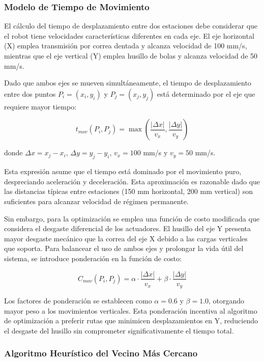 \subsubsection{Modelo de Tiempo de Movimiento}

El cálculo del tiempo de desplazamiento entre dos estaciones debe considerar que el robot tiene velocidades características diferentes en cada eje. El eje horizontal (X) emplea transmisión por correa dentada y alcanza velocidad de 100 mm/s, mientras que el eje vertical (Y) emplea husillo de bolas y alcanza velocidad de 50 mm/s.

Dado que ambos ejes se mueven simultáneamente, el tiempo de desplazamiento entre dos puntos $P_i = (x_i, y_i)$ y $P_j = (x_j, y_j)$ está determinado por el eje que requiere mayor tiempo:

\begin{equation}
t_{mov}(P_i, P_j) = \max\left(\frac{|\Delta x|}{v_x}, \frac{|\Delta y|}{v_y}\right)
\end{equation}

donde $\Delta x = x_j - x_i$, $\Delta y = y_j - y_i$, $v_x = 100$ mm/s y $v_y = 50$ mm/s.

Esta expresión asume que el tiempo está dominado por el movimiento puro, despreciando aceleración y deceleración. Esta aproximación es razonable dado que las distancias típicas entre estaciones (150 mm horizontal, 200 mm vertical) son suficientes para alcanzar velocidad de régimen permanente.

Sin embargo, para la optimización se emplea una función de costo modificada que considera el desgaste diferencial de los actuadores. El husillo del eje Y presenta mayor desgaste mecánico que la correa del eje X debido a las cargas verticales que soporta. Para balancear el uso de ambos ejes y prolongar la vida útil del sistema, se introduce ponderación en la función de costo:

\begin{equation}
C_{mov}(P_i, P_j) = \alpha \cdot \frac{|\Delta x|}{v_x} + \beta \cdot \frac{|\Delta y|}{v_y}
\end{equation}

Los factores de ponderación se establecen como $\alpha = 0.6$ y $\beta = 1.0$, otorgando mayor peso a los movimientos verticales. Esta ponderación incentiva al algoritmo de optimización a preferir rutas que minimicen desplazamientos en Y, reduciendo el desgaste del husillo sin comprometer significativamente el tiempo total.

\subsubsection{Algoritmo Heurístico del Vecino Más Cercano}

